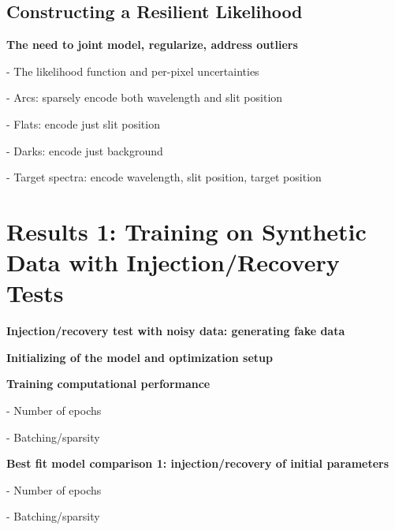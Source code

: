 \documentclass[twocolumn]{aastex631}
\begin{document}
\subsection{Constructing a Resilient Likelihood}
\begin{mdframed}
  \textbf{The need to joint model, regularize, address outliers} \par
  - The likelihood function and per-pixel uncertainties\par
  - Arcs: sparsely encode both wavelength and slit position\par
  - Flats: encode just slit position\par
  - Darks: encode just background\par
  - Target spectra: encode wavelength, slit position, target position\par
  \textcolor{lightgray}{\lipsum[7]}
\end{mdframed}


\section{Results 1: Training on Synthetic Data with Injection/Recovery Tests} \label{results1Synthetic}

\begin{mdframed}
  \textbf{Injection/recovery test with noisy data: generating fake data} \par
  \textcolor{lightgray}{\lipsum[9]}
\end{mdframed}

\begin{mdframed}
  \textbf{Initializing of the model and optimization setup} \par
  \textcolor{lightgray}{\lipsum[10]}
\end{mdframed}


\begin{mdframed}
  \textbf{Training computational performance} \par
  - Number of epochs\par
  - Batching/sparsity\par
  \textcolor{lightgray}{\lipsum[9]}
\end{mdframed}

\begin{mdframed}
  \textbf{Best fit model comparison 1: injection/recovery of initial parameters} \par
  - Number of epochs\par
  - Batching/sparsity\par
  \textcolor{lightgray}{\lipsum[10]}
\end{mdframed}
\end{document}
